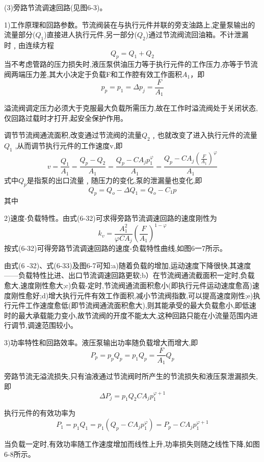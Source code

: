 (3)旁路节流调速回路(见图6-3)。

1)工作原理和回路参数。节流阀装在与执行元件并联的旁支油路上,定量泵输出的流量部分($Q_1$)直接进人执行元件,另一部分($Q_2$)通过节流阀流回油箱。不计泄漏时﹐由连续方程
$$
Q_p=Q_1+Q_2
$$
当不考虑管路的压力损失时,液压泵供油压力等于执行元件的工作压力,亦等于节流阀两端压力差,其大小决定于负载F和工作腔有效工作面积$A_1$，即
$$
p_p=p_1=\varDelta p_j=\frac{F}{A_1}
$$

溢流阀调定压力必须大于克服最大负载所需压力,故在工作时溢流阀处于关闭状态,仅回路过载时才打开,起安全保护作用。

调节节流阀通流面积,改变通过节流阀的流量$Q_2$﹐也就改变了进入执行元件的流量$Q_1$ ,从而调节执行元件的工作速度v,即
$$
v=\frac{Q_1}{A_1}=\frac{Q_p-Q_2}{A_1}=\frac{Q_p-CA_jp_{1}^{\varphi}}{A_1}=\frac{Q_p-CA_j\left( \frac{F}{A_1} \right) ^{\varphi}}{A_1}
$$
式中$Q_p$是指泵的出口流量﹐随压力的变化,泵的泄漏量也变化,即
$$
Q_p=Q_o-\varDelta Q_1=Q_o-C_1p
$$
其中 \quad
{}

2)速度-负载特性。由式(6-32)可求得旁路节流调速回路的速度刚性为
$$
k_v=\frac{A_{1}^{2}}{\varphi CA_j}\left( \frac{F}{A_1} \right) ^{1-\varphi}
$$
按式(6-32)可得旁路节流调速回路的速度-负载特性曲线,如图6一7所示。

由式(6 -32)、式(6-33)及图6-7可知:a)随着负载的增加,运动速度下降很快,其速度——负载特性比进、出口节流调速回路更软;b）在节流阀通流截面积一定时,负载愈大,速度刚性愈大;c)负载-定时,节流阀通流面积愈小(即执行元件运动速度愈高)速度刚性愈好;d)增大执行元件有效工作面积,减小节流阀指数,可以提高速度刚性;e)执行元件工作速度愈低(即节流阀通流面积愈大),则其能承受的最大负载愈小,即低速时的最大承载能力变小,故节流阀的开度不能太大,这种回路只能在小流量范围内进行调节,调速范围较小。

3)功率特性和回路效率。液压泵输出功率随负载增大而增大,即
$$
P_p=p_pQ_p=p_1Q_p=\frac{F}{A_1}Q_p
$$

旁路节流无溢流损失,只有油液通过节流阀时所产生的节流损失和液压泵泄漏损失,即
$$
\varDelta P_j=p_1Q_2CA_jp_{1}^{\varphi +1}
$$

执行元件的有效功率为
$$
P_1=p_1Q_1=p_1\left( Q_p-CA_jp_{1}^{\varphi} \right) =P_p-CA_jp_{1}^{\varphi +1}
$$

当负载一定时,有效功率随工作速度增加而线性上升,功率损失则随之线性下降,如图6-8所示。

